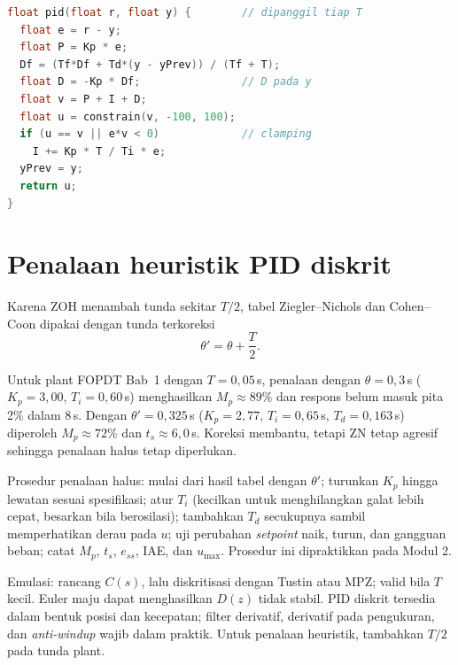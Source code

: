 \begin{lstlisting}[language=C++,caption={PID diskrit dengan D pada pengukuran dan \textit{clamping}},label={lst:b5-pid}]
float pid(float r, float y) {        // dipanggil tiap T
  float e = r - y;
  float P = Kp * e;
  Df = (Tf*Df + Td*(y - yPrev)) / (Tf + T);
  float D = -Kp * Df;                // D pada y
  float v = P + I + D;
  float u = constrain(v, -100, 100);
  if (u == v || e*v < 0)             // clamping
    I += Kp * T / Ti * e;
  yPrev = y;
  return u;
}
\end{lstlisting}

\section{Penalaan heuristik PID diskrit}
Karena ZOH menambah tunda sekitar $T/2$, tabel Ziegler--Nichols dan Cohen--Coon dipakai dengan tunda terkoreksi
\begin{equation}
	\theta' = \theta + \frac{T}{2}.
\end{equation}

\begin{contoh}
	Untuk plant FOPDT Bab~1 dengan $T = 0{,}05$\,s, penalaan dengan $\theta = 0{,}3$\,s ($K_p = 3{,}00$, $T_i = 0{,}60$\,s) menghasilkan $M_p \approx 89\%$ dan respons belum masuk pita 2\% dalam 8\,s. Dengan $\theta' = 0{,}325$\,s ($K_p = 2{,}77$, $T_i = 0{,}65$\,s, $T_d = 0{,}163$\,s) diperoleh $M_p \approx 72\%$ dan $t_s \approx 6{,}0$\,s. Koreksi membantu, tetapi ZN tetap agresif sehingga penalaan halus tetap diperlukan.
\end{contoh}

Prosedur penalaan halus: mulai dari hasil tabel dengan $\theta'$; turunkan $K_p$ hingga lewatan sesuai spesifikasi; atur $T_i$ (kecilkan untuk menghilangkan galat lebih cepat, besarkan bila berosilasi); tambahkan $T_d$ secukupnya sambil memperhatikan derau pada $u$; uji perubahan \textit{setpoint} naik, turun, dan gangguan beban; catat $M_p$, $t_s$, $e_{ss}$, IAE, dan $u_{\max}$. Prosedur ini dipraktikkan pada Modul 2.

\begin{ringkasan}
	Emulasi: rancang $C(s)$, lalu diskritisasi dengan Tustin atau MPZ; valid bila $T$ kecil. Euler maju dapat menghasilkan $D(z)$ tidak stabil. PID diskrit tersedia dalam bentuk posisi dan kecepatan; filter derivatif, derivatif pada pengukuran, dan \textit{anti-windup} wajib dalam praktik. Untuk penalaan heuristik, tambahkan $T/2$ pada tunda plant.\\[3pt]
\end{ringkasan}

